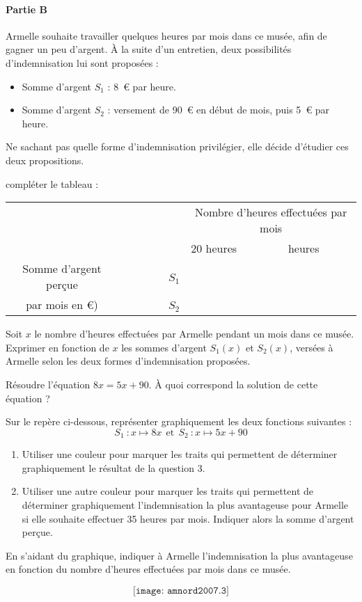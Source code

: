 \paragraph{Partie B}\hfill\newline
Armelle souhaite travailler quelques heures par mois dans ce musée, afin de gagner un peu d'argent. \`A la suite d'un entretien, deux possibilités d'indemnisation lui sont proposées :
 \begin{itemize}
\item  Somme d'argent $S_{1}$ :  8~\textgreek{\euro} par heure. 
\item  Somme d'argent $S_{2}$ : versement de 90~\textgreek{\euro} en début de mois, puis 5~\textgreek{\euro} par heure.
\end{itemize}
 Ne sachant pas quelle forme d'indemnisation privilégier, elle décide d'étudier ces deux propositions.
\begin{myenumerate}
\item compléter le tableau :\\
\begin{tabularx}{\linewidth}{|c|p{1.5cm}|*{2}{>{\centering \arraybackslash}X|}}\cline{3-4}
\multicolumn{2}{c|}{}&\multicolumn{2}{c|}{Nombre d'heures effectuées par mois}\\  \cline{3-4}
\multicolumn{2}{c|}{}&20 heures  & 25 heures\\ \hline
{\small Somme d'argent per\c{c}ue}&~~~~~~~~$S_{1}$&&\\ \hline
par mois en \textgreek{\euro})&~~~~~~~~$S_{2}$&&\\ \hline
\end{tabularx}
\item Soit $x$ le nombre d'heures effectuées par Armelle pendant un mois dans ce musée. Exprimer en fonction de $x$ les sommes d'argent $S_{1}(x)$ et $S_{2}(x)$, versées à Armelle selon les deux formes d'indemnisation proposées.
\item Résoudre l'équation $8x = 5x + 90$. \`A quoi correspond la solution de cette équation ?
\item Sur le repère ci-dessous, représenter graphiquement les deux fonctions suivantes :
\[S_1~: x \longmapsto 8x~~	\text{et}~~	S_{2}~: x \longmapsto 5x+90\]
\item \begin{enumerate}
\item Utiliser une couleur pour marquer les traits qui permettent de déterminer graphiquement le résultat de la question 3. 
\item Utiliser une autre couleur pour marquer les traits qui permettent de déterminer graphiquement l'indemnisation la plus avantageuse pour Armelle si elle souhaite effectuer 35 heures par mois. Indiquer alors la somme d'argent perçue.
\end{enumerate}
\item En s'aidant du graphique, indiquer à Armelle l'indemnisation la plus avantageuse en fonction du nombre d'heures effectuées par mois dans ce musée.
\end{myenumerate}
\[\texttt{[image: amnord2007.3]}\]